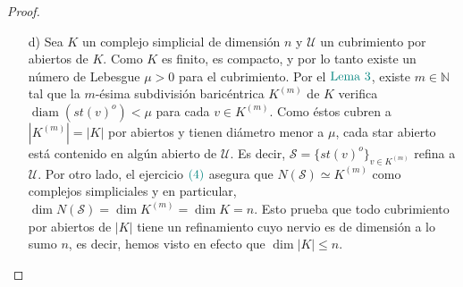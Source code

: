 \documentclass[11pt]{article}
\newcommand{\R}{\mathbb{R}}
\newcommand{\tint}[1]{#1^o}%
\newcommand{\diam}[1]{\operatorname{diam}(#1)}
\newcommand{\paint}[2]{\color{#1}{#2}}
\begin{document}
\begin{proof}
\begin{itemize}
Afirmamos ahora que $N(\mathcal{O})$ es de dimensi\'on a lo sumo $1$, o equivalentemente, que no hay tres intervalos de $\mathcal{O}$ cuya intersecci\'on sea no vac\'ia. Supongamos que s\'i y sean $\{J_i\}_{1 \leq i \leq 3} \subset \mathcal{O}$ de intersecci\'on no vac\'ia y tales que el interior de $J_i$ en $\R$ es $(a_i,b_i)$\footnote[1]{Esto evita tratar por separado la posible elecci\'on de $E_0$ o $E_1$, ya que al ser los \'unicos dos intervalos semiabiertos, el argumento que sigue funciona a\'un si $a_1 \in J_1$ o $b_3 \in J_3$. Siempre tenemos que tanto $J_2$ como $J_1 \cap J_3$ son intervalos abiertos, y no hace falta que las desigualdades entre $a_1$ y $a_2$ o $b_2$ y $b_3$ sean estrictas.}. Como los intervalos no se contienen entre s\'i, existen dos de ellos distintos con el menor extremo izquierdo y mayor extremo derecho, que suponemos son $J_1$ y $J_3$ respectivamente. As\'i, $J_1 \cap J_3 = (a_3,b_1)$. Como $J_2 \not \subseteq J_1$ debe ser $b_2 > b_1$, y similarmente como $J_2 \not \subseteq J_3$ tenemos que $a_2 < a_3$. Si ahora $s \in J_2$, entonces $a_1 \leq a_2 < s < b_2 \leq b_3$. Si $s \not \in J_1$, luego $s > b_1 > a_3$ y consecuentemente $s \in J_3$. En cualquier caso, $s \in J_1 \cup J_3$. Esto implica que $J_2 \subset J_1 \cap J_3$, lo que es absurdo: no hay entonces tres intervalos cuya intersecci\'on sea no vac\'ia. Dado un cubrimiento arbitrario encontramos un refinamiento cuyo nervio es de dimensi\'on a lo sumo $1$, lo que completa la demostraci\'on. 
\item[d)] Sea $K$ un complejo simplicial de dimensi\'on $n$ y $\mathcal{U}$ un cubrimiento por abiertos de $K$. Como $K$ es finito, es compacto, y por lo tanto existe un n\'umero de Lebesgue $\mu > 0$ para el cubrimiento. Por el $\paint{grey-light-blue}{\text{Lema }3}$, existe $m \in \mathbb{N}$ tal que la $m$-\'esima subdivisi\'on baric\'entrica $K^{(m)}$ de $K$ verifica $\diam{\tint{st(v)}} < \mu$ para cada $v \in K^{(m)}$. Como \'estos cubren a $|K^{(m)}| = |K|$ por abiertos y tienen di\'ametro menor a $\mu$, cada star abierto est\'a contenido en alg\'un abierto de $\mathcal{U}$. Es decir, $\mathcal{S} = \{\tint{st(v)}\}_{v \in K^{(m)}}$ refina a $\mathcal{U}$. Por otro lado, el ejercicio $\paint{grey-light-blue}{(4)}$ asegura que $N(\mathcal{S}) \simeq K^{(m)}$ como complejos simpliciales y en particular, $\dim N(\mathcal{S}) = \dim K^{(m)} = \dim K = n$. Esto prueba que todo cubrimiento por abiertos de $|K|$ tiene un refinamiento cuyo nervio es de dimensi\'on a lo sumo $n$, es decir, hemos visto en efecto que $\dim |K| \leq n$.
\end{itemize}
\end{proof}
\end{document}
